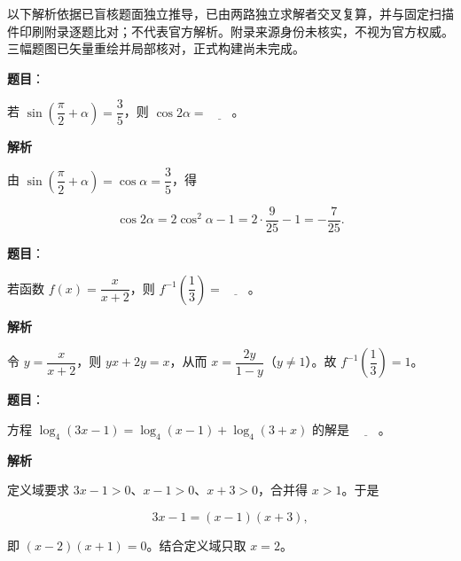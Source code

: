 

\begin{gktip}
以下解析依据已盲核题面独立推导，已由两路独立求解者交叉复算，并与固定扫描件印刷附录逐题比对；不代表官方解析。附录来源身份未核实，不视为官方权威。三幅题图已矢量重绘并局部核对，正式构建尚未完成。
\end{gktip}


\begin{answer}

\textbf{题目}：

若 $\sin\left(\dfrac{\pi}{2}+\alpha\right)=\dfrac{3}{5}$，则 $\cos 2\alpha=\underline{\qquad}$。

\textbf{解析}

由 $\sin\left(\dfrac\pi2+\alpha\right)=\cos\alpha=\dfrac35$，得

\nopagebreak[4]
\[
\cos2\alpha=2\cos^2\alpha-1=2\cdot\frac9{25}-1=-\frac7{25}.
\]


\end{answer}
\begin{answer}

\textbf{题目}：

若函数 $f(x)=\dfrac{x}{x+2}$，则 $f^{-1}\left(\dfrac{1}{3}\right)=\underline{\qquad}$。

\textbf{解析}

令 $y=\dfrac{x}{x+2}$，则 $yx+2y=x$，从而 $x=\dfrac{2y}{1-y}$（$y\ne1$）。故 $f^{-1}\left(\dfrac13\right)=1$。


\end{answer}
\begin{answer}

\textbf{题目}：

方程 $\log_4(3x-1)=\log_4(x-1)+\log_4(3+x)$ 的解是 $\underline{\qquad}$。

\textbf{解析}

定义域要求 $3x-1>0$、$x-1>0$、$x+3>0$，合并得 $x>1$。于是

\nopagebreak[4]
\[
3x-1=(x-1)(x+3),
\]

即 $(x-2)(x+1)=0$。结合定义域只取 $x=2$。


\end{answer}
